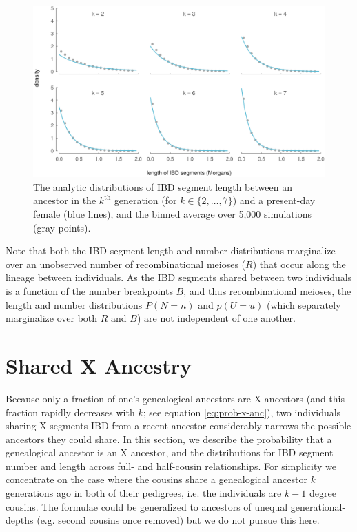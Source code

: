 \documentclass[9pt,twocolumn,twoside]{gsajnl}
\begin{document}
\begin{figure}[!ht]
  \centering
  \includegraphics[width=\textwidth]{images/x-ancestor-blocklens}

  \caption{The analytic distributions of IBD segment length between an ancestor
  in the $k^\text{th}$ generation (for $k \in \{2, \ldots, 7\}$) and a
  present-day female (blue lines), and the binned average over 5,000
  simulations (gray points).}

  \label{fig:x-len-dist}
\end{figure}

Note that both the IBD segment length and number distributions marginalize over
an unobserved number of recombinational meioses ($R$) that occur along the
lineage between individuals. As the IBD segments shared between two individuals
is a function of the number breakpoints $B$, and thus recombinational meioses,
the length and number distributions $P(N = n)$ and $p(U = u)$ (which separately
marginalize over both $R$ and $B$) are not independent of one another.

\section*{Shared X Ancestry}
\label{sec:shared-x-anc}

Because only a fraction of one's genealogical ancestors are X ancestors (and
this fraction rapidly decreases with $k$; see equation \eqref{eq:prob-x-anc}),
two individuals sharing X segments IBD from a recent ancestor considerably
narrows the possible ancestors they could share. In this section, we describe
the probability that a genealogical ancestor is an X ancestor, and the
distributions for IBD segment number and length across full- and half-cousin
relationships. For simplicity we concentrate on the case where the cousins
share a genealogical ancestor $k$ generations ago in both of their pedigrees,
i.e. the individuals are $k-1$ degree cousins. The formulae could be
generalized to ancestors of unequal generational-depths (e.g. second cousins
once removed) but we do not pursue this here.
\end{document}
